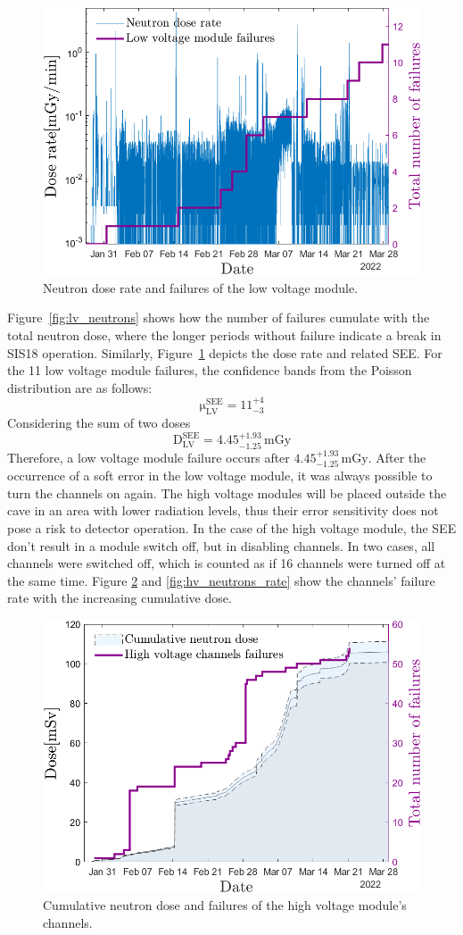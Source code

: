 \begin{figure}[!h]
    \centering
    \includegraphics[width=0.6\columnwidth]{Chapter4/images/neutrons_dose_rate.png}
    \caption{Neutron dose rate and failures of the low voltage module.}
    \label{fig:lv_neutrons_rate}
\end{figure}
Figure~\ref{fig:lv_neutrons} shows how the number of failures cumulate with the total neutron dose, where the longer periods without failure indicate a break in SIS18 operation. Similarly, Figure~\ref{fig:lv_neutrons_rate} depicts the dose rate and related \gls{SEE}.
For the 11 low voltage module failures, the confidence bands from the Poisson distribution are as follows:
   \begin{equation}
  \mathrm{\mu}_{\mathrm{LV}}^{\mathrm{SEE}}=\mathrm{11}_{-3}^{+4}
\end{equation}
Considering the sum of two doses
\begin{equation}
    \mathrm{D}_{\mathrm{LV}}^{\mathrm{SEE}}=\mathrm{4.45}_{-1.25}^{+1.93}\mathrm{\,mGy}
\end{equation}
Therefore, a low voltage module failure occurs after $\mathrm{4.45}_{-1.25}^{+1.93}\mathrm{\,mGy}.$ After the occurrence of a soft error in the low voltage module, it was always possible to turn the channels on again.
\newpage
The high voltage modules will be placed outside the cave in an area with lower radiation levels, thus their error sensitivity does not pose a risk to detector operation. In the case of the high voltage module, the \gls{SEE} don't result in a module switch off, but in disabling channels. In two cases, all channels were switched off, which is counted as if 16 channels were turned off at the same time. Figure \ref{fig:hv_neutrons} and \ref{fig:hv_neutrons_rate} show the channels' failure rate with the increasing cumulative dose. 
\begin{figure}[!h]
    \centering
    \includegraphics[width=0.6\columnwidth]{Chapter4/images/HV_failure_and_neutronrate.png}
    \caption{Cumulative neutron dose and failures of the high voltage module's channels.}
    \label{fig:hv_neutrons}
\end{figure}

